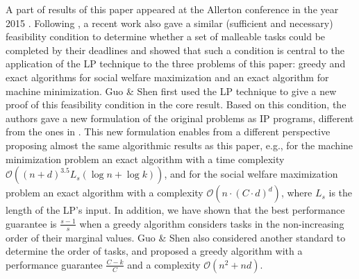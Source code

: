 \documentclass[10pt,journal,compsoc]{IEEEtran}
\begin{document}
A part of results of this paper appeared at the Allerton conference in the year 2015 \cite{Wu15a,Wu15b}. Following \cite{Wu15a,Wu15b}, a recent work also gave a similar (sufficient and necessary) feasibility condition to determine whether a set of malleable tasks could be completed by their deadlines and showed that such a condition is central to the application of the LP technique to the three problems of this paper: greedy and exact algorithms for social welfare maximization and an exact algorithm for machine minimization. Guo \& Shen first used the LP technique to give a new proof of this feasibility condition in the core result. Based on this condition, the authors gave a new formulation of the original problems as IP programs, different from the ones in \cite{Jain11a,Jain}. This new formulation enables from a different perspective proposing almost the same algorithmic results as this paper, e.g., for the machine minimization problem an exact algorithm with a time complexity $\mathcal{O}((n+d)^{3.5}L_{s}(\log{n}+\log{k}))$, and for the social welfare maximization problem an exact algorithm with a complexity $\mathcal{O}(n\cdot (C\cdot d)^{d})$, where $L_{s}$ is the length of the LP's input. In addition, we have shown that the best performance guarantee is $\frac{s-1}{s}$ when a greedy algorithm considers tasks in the non-increasing order of their marginal values. Guo \& Shen also considered another standard to determine the order of tasks, and proposed a greedy algorithm with a performance guarantee $\frac{C-k}{C}$ and a complexity $\mathcal{O}(n^{2}+nd)$.
\end{document}
